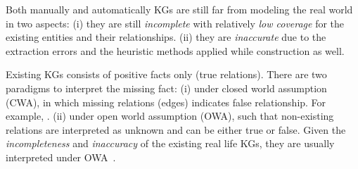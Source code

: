  Both manually and automatically KGs are still far from modeling the real world in two aspects: (i) they are still \textit{incomplete} with relatively \textit{low coverage} for the existing entities and their relationships. (ii) they are \textit{inaccurate} due to the extraction errors and the heuristic methods applied while construction as well.  

 Existing KGs consists of positive facts only (\ie true relations). There are two paradigms to interpret the missing fact: (i) under closed world assumption (CWA), in which missing relations (\ie edges) indicates false relationship. For example, . (ii) under open world assumption (OWA), such that non-existing relations are interpreted as unknown and can be either true or false. Given the \textit{incompleteness} and \textit{inaccuracy} of the existing real life KGs, they are usually interpreted under OWA~\cite{Nickel2015ARO}. 
